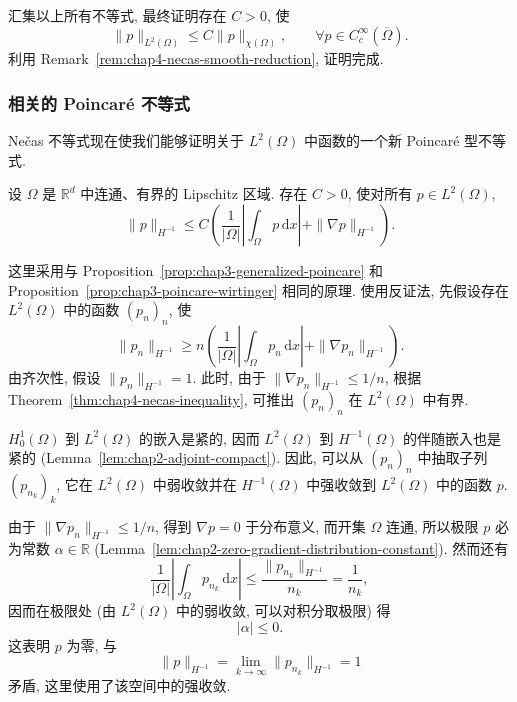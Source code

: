 \begin{Proof}
汇集以上所有不等式, 最终证明存在 $C>0$, 使
\[
 \|p\|_{L^2(\Omega)}\leq C\|p\|_{\chi(\Omega)},
 \qquad\forall p\in C_c^\infty(\overline\Omega).
\]
利用 Remark~\ref{rem:chap4-necas-smooth-reduction}, 证明完成.
\end{Proof}

\subsubsection{相关的 Poincar\'e 不等式}
\label{subsec:chap4-related-poincare-inequalities}

Nečas 不等式现在使我们能够证明关于 $L^2(\Omega)$ 中函数的一个新 Poincar\'e 型不等式.

\begin{Proposition}
\label{prop:chap4-hminusone-poincare}
设 $\Omega$ 是 $\mathbb R^d$ 中连通、有界的 Lipschitz 区域. 存在 $C>0$, 使对所有 $p\in L^2(\Omega)$,
\[
 \|p\|_{H^{-1}}
 \leq C\left(\frac1{|\Omega|}\left|\int_\Omega p\,\mathrm dx\right|
 +\|\nabla p\|_{H^{-1}}\right).
\]
\end{Proposition}

\begin{Proof}
这里采用与 Proposition~\ref{prop:chap3-generalized-poincare} 和 Proposition~\ref{prop:chap3-poincare-wirtinger} 相同的原理. 使用反证法, 先假设存在 $L^2(\Omega)$ 中的函数 $(p_n)_n$, 使
\[
 \|p_n\|_{H^{-1}}
 \geq n\left(\frac1{|\Omega|}\left|\int_\Omega p_n\,\mathrm dx\right|
 +\|\nabla p_n\|_{H^{-1}}\right).
\]
由齐次性, 假设 $\|p_n\|_{H^{-1}}=1$. 此时, 由于 $\|\nabla p_n\|_{H^{-1}}\leq1/n$, 根据 Theorem~\ref{thm:chap4-necas-inequality}, 可推出 $(p_n)_n$ 在 $L^2(\Omega)$ 中有界.

$H_0^1(\Omega)$ 到 $L^2(\Omega)$ 的嵌入是紧的, 因而 $L^2(\Omega)$ 到 $H^{-1}(\Omega)$ 的伴随嵌入也是紧的 (Lemma~\ref{lem:chap2-adjoint-compact}). 因此, 可以从 $(p_n)_n$ 中抽取子列 $(p_{n_k})_k$, 它在 $L^2(\Omega)$ 中弱收敛并在 $H^{-1}(\Omega)$ 中强收敛到 $L^2(\Omega)$ 中的函数 $p$.

由于 $\|\nabla p_n\|_{H^{-1}}\leq1/n$, 得到 $\nabla p=0$ 于分布意义, 而开集 $\Omega$ 连通, 所以极限 $p$ 必为常数 $\alpha\in\mathbb R$ (Lemma~\ref{lem:chap2-zero-gradient-distribution-constant}). 然而还有
\[
 \frac1{|\Omega|}\left|\int_\Omega p_{n_k}\,\mathrm dx\right|
 \leq\frac{\|p_{n_k}\|_{H^{-1}}}{n_k}
 =\frac1{n_k},
\]
因而在极限处 (由 $L^2(\Omega)$ 中的弱收敛, 可以对积分取极限) 得
\[
 |\alpha|\leq0.
\]
这表明 $p$ 为零, 与
\[
 \|p\|_{H^{-1}}
 =\lim_{k\to\infty}\|p_{n_k}\|_{H^{-1}}=1
\]
矛盾, 这里使用了该空间中的强收敛.
\end{Proof}

